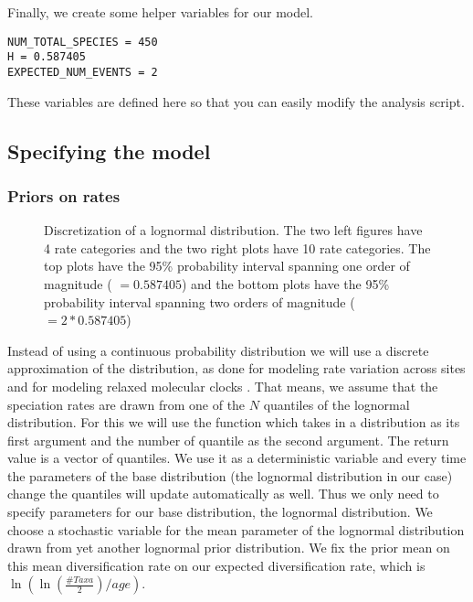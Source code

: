Finally, we create some helper variables for our model.
{\tt \begin{snugshade*}
\begin{lstlisting}
NUM_TOTAL_SPECIES = 450
H = 0.587405
EXPECTED_NUM_EVENTS = 2
\end{lstlisting}
\end{snugshade*}}
These variables are defined here so that you can easily modify the analysis script.

\subsection{Specifying the model}

\subsubsection{Priors on rates}
\begin{figure}[htbp!]
\centering
{}
\caption{\small Discretization of a lognormal distribution. The two left figures have 4 rate categories and the two right plots have 10 rate categories. The top plots have the 95\% probability interval spanning one order of magnitude ( $=0.587405$) and the bottom plots have the 95\% probability interval spanning two orders of magnitude ( $=2*0.587405$)}
\label{fig:BSBD_likelihood}
\end{figure}
Instead of using a continuous probability distribution we will use a discrete approximation of the distribution, as done for modeling rate variation across sites \citep{Yang1994a} and for modeling relaxed molecular clocks \citep{Drummond2006}.
That means, we assume that the speciation rates are drawn from one of the $N$ quantiles of the lognormal distribution.
For this we will use the function  which takes in a distribution as its first argument and the number of quantile as the second argument.
The return value is a vector of quantiles.
We use it as a deterministic variable and every time the parameters of the base distribution (\IE the lognormal distribution in our case) change the quantiles will update automatically as well.
Thus we only need to specify parameters for our base distribution, the lognormal distribution.
We choose a stochastic variable for the mean parameter of the lognormal distribution drawn from yet another lognormal prior distribution.
We fix the prior mean on this mean diversification rate on our expected diversification rate, which is $\ln( \ln(\frac{\#Taxa}{2})/age )$.

